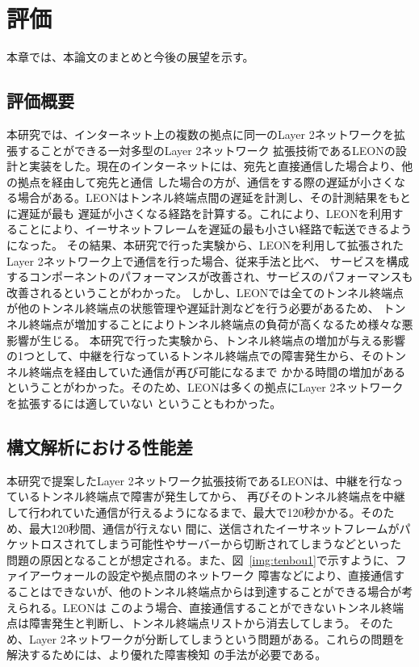 \chapter{評価}
\label{conclusion}

本章では、本論文のまとめと今後の展望を示す。

\section{評価概要}

本研究では、インターネット上の複数の拠点に同一のLayer 2ネットワークを拡張することができる一対多型のLayer 2ネットワーク
拡張技術であるLEONの設計と実装をした。現在のインターネットには、宛先と直接通信した場合より、他の拠点を経由して宛先と通信
した場合の方が、通信をする際の遅延が小さくなる場合がある。LEONはトンネル終端点間の遅延を計測し、その計測結果をもとに遅延が最も
遅延が小さくなる経路を計算する。これにより、LEONを利用することにより、イーサネットフレームを遅延の最も小さい経路で転送できるようになった。
その結果、本研究で行った実験から、LEONを利用して拡張されたLayer 2ネットワーク上で通信を行った場合、従来手法と比べ、
サービスを構成するコンポーネントのパフォーマンスが改善され、サービスのパフォーマンスも改善されるということがわかった。
しかし、LEONでは全てのトンネル終端点が他のトンネル終端点の状態管理や遅延計測などを行う必要があるため、
トンネル終端点が増加することによりトンネル終端点の負荷が高くなるため様々な悪影響が生じる。
本研究で行った実験から、トンネル終端点の増加が与える影響の1つとして、中継を行なっているトンネル終端点での障害発生から、そのトンネル終端点を経由していた通信が再び可能になるまで
かかる時間の増加があるということがわかった。そのため、LEONは多くの拠点にLayer 2ネットワークを拡張するには適していない
ということもわかった。

\section{構文解析における性能差}

本研究で提案したLayer 2ネットワーク拡張技術であるLEONは、中継を行なっているトンネル終端点で障害が発生してから、
再びそのトンネル終端点を中継して行われていた通信が行えるようになるまで、最大で120秒かかる。そのため、最大120秒間、通信が行えない
間に、送信されたイーサネットフレームがパケットロスされてしまう可能性やサーバーから切断されてしまうなどといった
問題の原因となることが想定される。また、図~\ref{img:tenbou1}で示すように、ファイアーウォールの設定や拠点間のネットワーク
障害などにより、直接通信することはできないが、他のトンネル終端点からは到達することができる場合が考えられる。LEONは
このよう場合、直接通信することができないトンネル終端点は障害発生と判断し、トンネル終端点リストから消去してしまう。
そのため、Layer 2ネットワークが分断してしまうという問題がある。これらの問題を解決するためには、より優れた障害検知
の手法が必要である。

